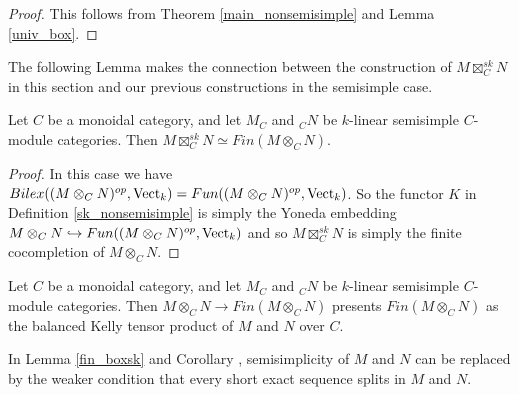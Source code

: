 \begin{proof}
  This follows from Theorem \ref{main_nonsemisimple} and Lemma \ref{univ_box}.
\end{proof}

The following Lemma makes the connection between the construction of
$M\boxtimes_C^{sk}N$ in this section and our previous constructions in the
semisimple case.

%

\begin{lemma}\label{fin_boxsk}

  \noindent Let $C$ be a monoidal category, and let $M_C$ and $_{C}N$ be
  $k$-linear semisimple $C$-module categories. Then $M\boxtimes_C^{sk}N\simeq
  Fin(M\otimes_C N)$.
\end{lemma}

\begin{proof}
  In this case we have $Bilex((M\otimes_C N)^{op},\operatorname{Vect}_k)=Fun((M\otimes_C
  N)^{op},\operatorname{Vect}_k)$. So the functor $K$ in Definition \ref{sk_nonsemisimple}
  is simply the Yoneda embedding $M\otimes_C N\hookrightarrow Fun((M\otimes_C
  N)^{op},\operatorname{Vect}_k)$ and so $M\boxtimes_C^{sk} N$ is simply the finite
  cocompletion of $M\otimes_C N$.
\end{proof}

\begin{corollary}\label{fin_kelly}
  Let $C$ be a monoidal category, and let $M_C$ and $_{C}N$ be $k$-linear
  semisimple $C$-module categories. Then $M\otimes_CN\to Fin(M\otimes_C N)$
  presents $Fin(M\otimes_C N)$ as the balanced Kelly tensor product of $M$ and
  $N$ over $C$.
\end{corollary}

\begin{remark}
  In Lemma \ref{fin_boxsk} and Corollary \label{fin_kelly}, semisimplicity of
  $M$ and $N$ can be replaced by the weaker condition that every short exact
  sequence splits in $M$ and $N$.
\end{remark}


